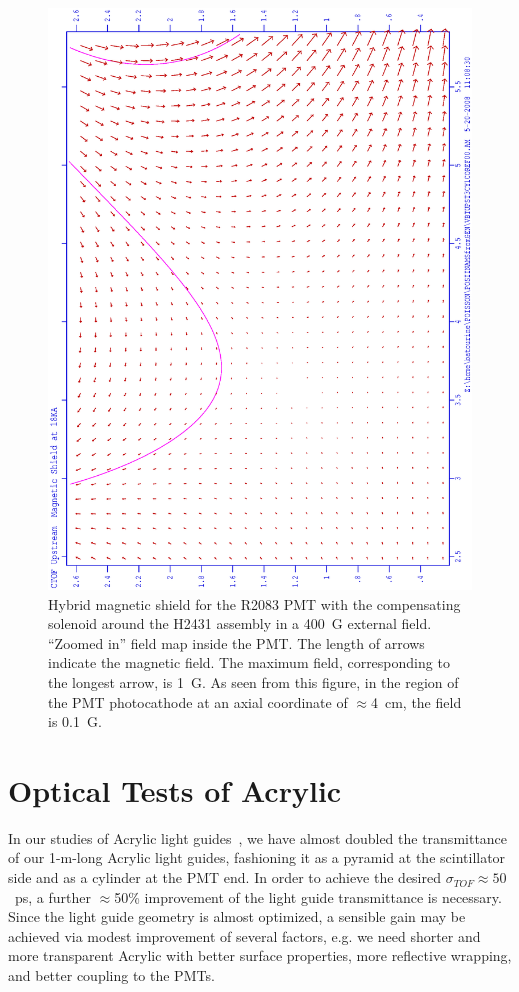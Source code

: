 \begin{figure}[htbp]
\centering
\includegraphics[width=.6\textwidth]{VBTUPST3CY1COREF0002.eps}
\caption{\small{Hybrid magnetic shield for the R2083 PMT with the compensating 
solenoid around the H2431 assembly in a 400~G external field. ``Zoomed in'' field 
map inside the PMT.  The length of arrows indicate the magnetic field.  The maximum 
field, corresponding to the longest arrow, is 1~G.  As seen from this figure, in the 
region of the PMT photocathode at an axial coordinate of $\approx$4~cm, the field is 
0.1~G.}}
\label{VBT3CYUS2}
\end{figure}

\section{Optical Tests of Acrylic}
  
In our studies of Acrylic light guides~\cite{r1,llg}, we have almost doubled 
the transmittance of our 1-m-long Acrylic light guides, fashioning it as a 
pyramid at the scintillator side and as a cylinder at the PMT end.  In order 
to achieve the desired  $\sigma_{TOF}\approx 50$~ps, a further $\approx$50\%  
improvement of the light guide transmittance is necessary.  Since the light 
guide geometry is almost optimized, a sensible gain may be achieved via modest  
improvement of several factors, e.g. we need shorter and more transparent 
Acrylic with better surface properties, more reflective wrapping, and better 
coupling to the PMTs. 

